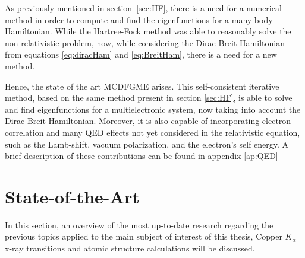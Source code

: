 As previously mentioned in section~\ref{sec:HF}, there is a need for a numerical method in order to compute and find the eigenfunctions for a many-body Hamiltonian. While the Hartree-Fock method was able to reasonably solve the non-relativistic problem, now, while considering the Dirac-Breit Hamiltonian from equations \eqref{eq:diracHam} and \eqref{eq:BreitHam}, there is a need for a new method.

Hence, the state of the art \gls{MCDFGME} arises. This self-consistent iterative method, based on the same method present in section \ref{sec:HF}, is able to solve and find eigenfunctions for a multielectronic system, now taking into account the Dirac-Breit Hamiltonian. Moreover, it is also capable of incorporating electron correlation and many QED effects not yet considered in the relativistic equation, such as the Lamb-shift, vacuum polarization, and the electron's self energy.
A brief description of these contributions can be found in  appendix \ref{ap:QED}




\section{State-of-the-Art}
In this section, an overview of the most up-to-date research regarding the previous topics applied to the main subject of interest of this thesis, Copper $K_\alpha$ x-ray transitions and atomic structure calculations will be discussed. 

